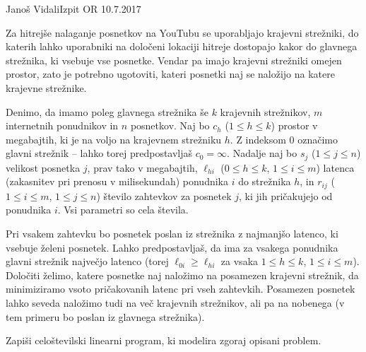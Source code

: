 \begin{naloga}{Janoš Vidali}{Izpit OR 10.7.2017}
\begin{vprasanje}[youtube]
Za hitrejše nalaganje posnetkov na YouTubu se uporabljajo krajevni strežniki,
do katerih lahko uporabniki na določeni lokaciji hitreje dostopajo
kakor do glavnega strežnika, ki vsebuje vse posnetke.
Vendar pa imajo krajevni strežniki omejen prostor,
zato je potrebno ugotoviti,
kateri posnetki naj se naložijo na katere krajevne strežnike.

Denimo, da imamo poleg glavnega strežnika še $k$ krajevnih strežnikov,
$m$ internetnih po\-nud\-ni\-kov in $n$ posnetkov.
Naj bo $c_h$ ($1 \le h \le k$) prostor v megabajtih,
ki je na voljo na krajevnem strežniku $h$.
Z indeksom $0$ označimo glavni strežnik
-- lahko torej predpostavljaš $c_0 = \infty$.
Nadalje naj bo $s_j$ ($1 \le j \le n$) velikost posnetka $j$,
prav tako v megabajtih,
$\ell_{hi}$ ($0 \le h \le k$, $1 \le i \le m$)
latenca (zakasnitev pri prenosu v milisekundah)
ponudnika $i$ do strežnika $h$,
in $r_{ij}$ ($1 \le i \le m$, $1 \le j \le n$)
število zahtevkov za posnetek $j$, ki jih pričakujejo od ponudnika $i$.
Vsi parametri so cela števila.

Pri vsakem zahtevku bo posnetek poslan iz strežnika z najmanjšo latenco,
ki vsebuje želeni posnetek.
Lahko predpostavljaš,
da ima za vsakega ponudnika glavni strežnik največjo latenco
(torej $\ell_{0i} \ge \ell_{hi}$ za vsaka $1 \le h \le k$, $1 \le i \le m$).
Določiti želimo, katere posnetke naj naložimo na posamezen krajevni strežnik,
da minimiziramo vsoto pričakovanih latenc pri vseh zahtevkih.
Posamezen posnetek lahko seveda naložimo tudi na več krajevnih strežnikov,
ali pa na nobenega (v tem primeru bo poslan iz glavnega strežnika).

Zapiši celoštevilski linearni program, ki modelira zgoraj opisani problem.
\end{vprasanje}
\begin{odgovor}
\end{odgovor}
\end{naloga}


